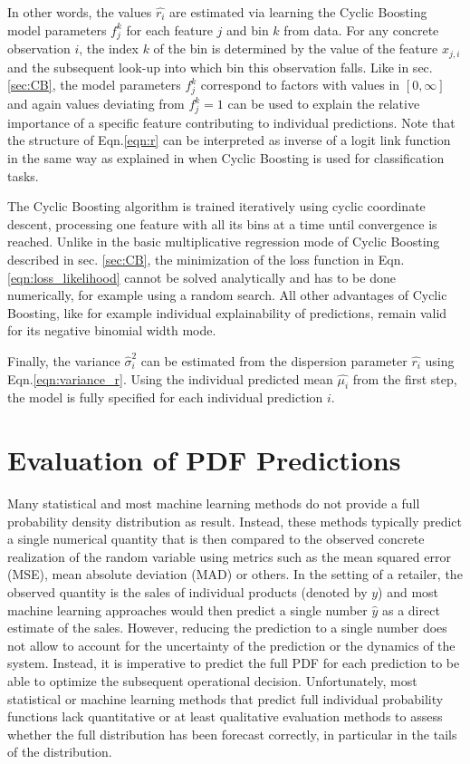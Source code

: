 \documentclass[BCOR=1mm, DIV=calc,10pt,
twoside=true,
twocolumn,
headings=normal]{scrartcl}
\newcommand{\eqn}{Eqn.}
\begin{document}
In other words, the values $\hat{r_i}$ are estimated via learning the Cyclic Boosting model parameters $f^k_j$ for each feature $j$ and bin $k$ from data. For any concrete observation $i$, the index $k$ of the bin is determined by the value of the feature $x_{j,i}$ and the subsequent look-up into which bin this observation falls. Like in sec. \ref{sec:CB}, the model parameters $f^k_j$ correspond to factors with values in $[0, \infty]$ and again values deviating from $f^k_j=1$ can be used to explain the relative importance of a specific feature contributing to individual predictions. Note that the structure of \eqn \eqref{eqn:r} can be interpreted as inverse of a logit link function in the same way as explained in \cite{Wick2019} when Cyclic Boosting is used for classification tasks.

The Cyclic Boosting algorithm is trained iteratively using cyclic coordinate descent, processing one feature with all its bins at a time until convergence is reached. Unlike in the basic multiplicative regression mode of Cyclic Boosting described in sec. \ref{sec:CB}, the minimization of the loss function in \eqn \eqref{eqn:loss_likelihood} cannot be solved analytically and has to be done numerically, for example using a random search. All other advantages of Cyclic Boosting, like for example individual explainability of predictions, remain valid for its negative binomial width mode.

Finally, the variance $\hat{\sigma}^2_i$ can be estimated from the dispersion parameter $\hat{r_i}$ using \eqn \eqref{eqn:variance_r}. Using  the individual predicted mean $\hat{\mu_i}$ from the first step, the model is fully specified for each individual prediction $i$.


\section{Evaluation of PDF Predictions}
\label{sec:pdfEvaluation}

Many statistical and most machine learning methods do not provide a full probability density distribution as result. Instead, these methods typically predict a single numerical quantity that is then compared to the observed concrete realization of the random variable using metrics such as the mean squared error (MSE),  mean absolute deviation (MAD) or others. In the setting of a retailer, the observed quantity is the sales of individual products (denoted by $y$) and most machine learning approaches would then predict a single number $\hat{y}$ as a direct estimate of the sales. However, reducing the prediction to a single number does not allow to account for the uncertainty of the prediction or the dynamics of the system. Instead, it is imperative to predict the full PDF for each prediction to be able to optimize the subsequent operational decision. Unfortunately, most statistical or machine learning methods that predict full individual probability functions lack quantitative or at least qualitative evaluation methods to assess whether the full distribution has been forecast correctly, in particular in the tails of the distribution.
\end{document}
